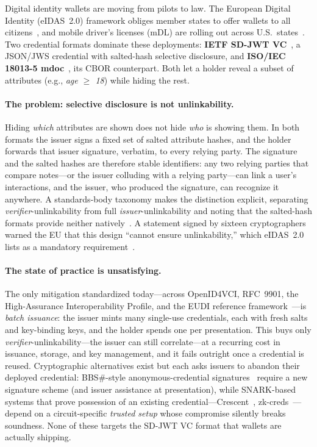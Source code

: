 \documentclass[11pt]{article}
\theoremstyle{plain}
\theoremstyle{definition}
\begin{document}
Digital identity wallets are moving from pilots to law. The European Digital
Identity (eIDAS~2.0) framework obliges member states to offer wallets to all
citizens~\cite{eidas2}, and mobile driver's licenses (mDL) are rolling out across
U.S.\ states~\cite{aamva-mdl}. Two credential formats dominate these deployments:
\textbf{IETF SD-JWT VC}~\cite{sdjwtvc}, a JSON/JWS credential with salted-hash
selective disclosure, and \textbf{ISO/IEC 18013-5 mdoc}~\cite{iso18013}, its CBOR
counterpart. Both let a holder reveal a subset of attributes (e.g., \emph{age
$\geq$ 18}) while hiding the rest.

\paragraph{The problem: selective disclosure is not unlinkability.}
Hiding \emph{which} attributes are shown does not hide \emph{who} is showing them.
In both formats the issuer signs a fixed set of salted attribute hashes, and the
holder forwards that issuer signature, verbatim, to every relying party. The
signature and the salted hashes are therefore stable identifiers: any two relying
parties that compare notes---or the issuer colluding with a relying party---can link
a user's interactions, and the issuer, who produced the signature, can recognize it
anywhere. A standards-body taxonomy makes the distinction explicit, separating
\emph{verifier}-unlinkability from full \emph{issuer}-unlinkability and noting that
the salted-hash formats provide neither natively~\cite{etsi119476}. A statement
signed by sixteen cryptographers warned the EU that this design ``cannot ensure
unlinkability,'' which eIDAS~2.0 lists as a mandatory requirement~\cite{eudi-crypto-feedback}.

\paragraph{The state of practice is unsatisfying.}
The only mitigation standardized today---across OpenID4VCI, RFC~9901, the
High-Assurance Interoperability Profile, and the EUDI reference
framework~\cite{openid4vci,rfc9901,haip,eudi-arf}---is \emph{batch issuance}: the
issuer mints many single-use credentials, each with fresh salts and key-binding
keys, and the holder spends one per presentation. This buys only
\emph{verifier}-unlinkability---the issuer can still correlate---at a recurring cost
in issuance, storage, and key management, and it fails outright once a credential is
reused. Cryptographic alternatives exist but each asks issuers to abandon their
deployed credential: BBS\#-style anonymous-credential signatures~\cite{bbs-sharp2025}
require a new signature scheme (and issuer assistance at presentation), while
SNARK-based systems that prove possession of an existing
credential---Crescent~\cite{paquin2024crescent}, zk-creds~\cite{rosenberg2023zkcreds}---depend
on a circuit-specific \emph{trusted setup} whose compromise silently breaks
soundness. None of these targets the SD-JWT VC format that wallets are actually
shipping.
\end{document}
